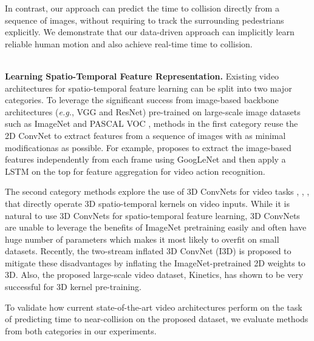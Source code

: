 In contrast, our approach can predict the time to collision directly from a sequence of images, without requiring to track the surrounding pedestrians explicitly. We demonstrate that our data-driven approach can implicitly learn reliable human motion and also achieve real-time time to collision.


\noindent\\
\textbf{Learning Spatio-Temporal Feature Representation.} Existing video architectures for spatio-temporal feature learning can be split into two major categories. To leverage the significant success from image-based backbone architectures (\emph{e.g.}, VGG and ResNet) pre-trained on large-scale image datasets such as ImageNet \cite{imagenet} and PASCAL VOC \cite{pascalVOC}, methods in the first category reuse the 2D ConvNet to extract features from a sequence of images with as minimal modificationas as possible. For example, \cite{BeyondSS} proposes to extract the image-based features independently from each frame using GoogLeNet and then apply a LSTM \cite{lstm} on the top for feature aggregation for video action recognition.

The second category methods explore the use of 3D ConvNets for video tasks \cite{C3D}, \cite{videoResNet}, \cite{p3d}, \cite{two-stream} that directly operate 3D spatio-temporal kernels on video inputs. While it is natural to use 3D ConvNets for spatio-temporal feature learning, 3D ConvNets are unable to leverage the benefits of ImageNet pretraining easily and often have huge number of parameters which makes it most likely to overfit on small datasets. Recently, the two-stream inflated 3D ConvNet (I3D) \cite{i3d} is proposed to mitigate these disadvantages by inflating the ImageNet-pretrained 2D weights to 3D. Also, the proposed large-scale video dataset, Kinetics, has shown to be very successful for 3D kernel pre-training.
 

To validate how current state-of-the-art video architectures perform on the task of predicting time to near-collision on the proposed dataset, we evaluate methods from both categories in our experiments.



